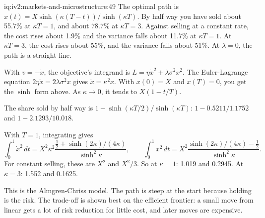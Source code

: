 \begin{solution}{iq:iv2:markets-and-microstructure:49}
The optimal path is $x(t) = X\sinh(\kappa(T - t))/\sinh(\kappa T)$. By half way you have sold about 55.7\% at $\kappa T = 1$, and about 78.7\% at $\kappa T = 3$. Against selling at a constant rate, the cost rises about 1.9\% and the variance falls about 11.7\% at $\kappa T = 1$. At $\kappa T = 3$, the cost rises about 55\%, and the variance falls about 51\%. At $\lambda = 0$, the path is a straight line.

With $v = -\dot x$, the objective's integrand is $L = \eta\dot x^2 + \lambda\sigma^2x^2$. The Euler-Lagrange equation $2\eta\ddot x = 2\lambda\sigma^2 x$ gives $\ddot x = \kappa^2x$. With $x(0) = X$ and $x(T) = 0$, you get the $\sinh$ form above. As $\kappa \to 0$, it tends to $X(1 - t/T)$.

The share sold by half way is $1 - \sinh(\kappa T/2)/\sinh(\kappa T)$: $1 - 0.5211/1.1752$ and $1 - 2.1293/10.018$.

With $T = 1$, integrating gives
\[
\int_0^1\dot x^2\,dt = X^2\kappa^2\frac{\tfrac12 + \sinh(2\kappa)/(4\kappa)}{\sinh^2\kappa},\qquad
\int_0^1 x^2\,dt = X^2\frac{\sinh(2\kappa)/(4\kappa) - \tfrac12}{\sinh^2\kappa}.
\]
For constant selling, these are $X^2$ and $X^2/3$. So at $\kappa = 1$: 1.019 and 0.2945. At $\kappa = 3$: 1.552 and 0.1625.

This is the Almgren-Chriss model. The path is steep at the start because holding is the risk. The trade-off is shown best on the efficient frontier: a small move from linear gets a lot of risk reduction for little cost, and later moves are expensive.

\end{solution}

